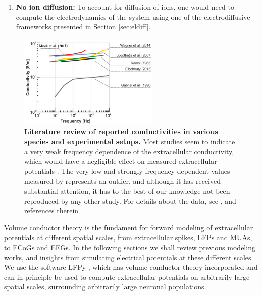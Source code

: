 \documentclass[preprint,11pt,authoryear]{elsarticle}
\newcommand{\gex}[1]{{\color{red}#1}}
\begin{document}
\begin{itemize}
\begin{itemize}
\begin{enumerate}
\item {\bf No \gex{ion} diffusion:} To account for diffusion \gex{of ions}, one would need to compute the electrodynamics of the system using one of the electrodiffusive frameworks presented in Section \ref{sec:eldiff}.

\end{enumerate}


\begin{figure}[!ht]
\begin{center}
\includegraphics[width=0.6\textwidth]{frequency_dependence}
\end{center}
\caption{\textbf{Literature review of reported conductivities in various species and experimental setups.} 
Most studies seem to indicate a very weak frequency dependence of the extracellular conductivity, which would have a negligible effect on measured extracellular potentials \citep{Miceli2017}. The very low and strongly frequency dependent values measured by \cite{Gabriel1996} represents an outlier, and although it has received substantial attention, it has to the best of our knowledge not been reproduced by any other study.
For details about the data, see \citep{Miceli2017}, and references therein \citep{Ranck1963, Gabriel1996, Logothetis2007, Elbohouty2013, Wagner2014}
}
\label{fig:freq_dep}
\end{figure}


Volume conductor theory is the fundament for forward modeling of extracellular potentials at different spatial scales, from extracellular spikes, LFPs and MUAs, to ECoGs and EEGs. In the following sections we shall review previous modeling works, and insights from simulating electrical potentials at these different scales.
We use the software LFPy \citep{Linden2014, Hagen2018, Hagen2019}, which has volume conductor theory incorporated and can in principle be used to compute extracellular potentials on arbitrarily large spatial scales, surrounding arbitrarily large neuronal populations. 



\end{itemize}
\end{itemize}
\end{document}
